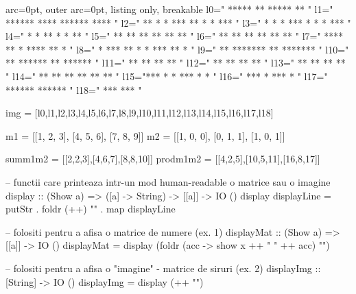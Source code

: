 \begin{tcblisting}{ arc=0pt, outer arc=0pt, listing only, breakable}
l0="        ***** **            ***** **    "
l1="     ******  ****        ******  ****   "
l2="    **   *  *  ***      **   *  *  ***  "
l3="   *    *  *    ***    *    *  *    *** "
l4="       *  *      **        *  *      ** "
l5="      ** **      **       ** **      ** "
l6="      ** **      **       ** **      ** "
l7="    **** **      *      **** **      *  "
l8="   * *** **     *      * *** **     *   "
l9="      ** *******          ** *******    "
l10="      ** ******           ** ******     "
l11="      ** **               ** **         "
l12="      ** **               ** **         "
l13="      ** **               ** **         "
l14=" **   ** **          **   ** **         "
l15="***   *  *          ***   *  *          "
l16=" ***    *            ***    *           "
l17="  ******              ******            "
l18="    ***                 ***             "

img = [l0,l1,l2,l3,l4,l5,l6,l7,l8,l9,l10,l11,l12,l13,l14,l15,l16,l17,l18]

m1 = [[1, 2, 3], [4, 5, 6], [7, 8, 9]]
m2 = [[1, 0, 0], [0, 1, 1], [1, 0, 1]]

summ1m2 = [[2,2,3],[4,6,7],[8,8,10]]
prodm1m2 = [[4,2,5],[10,5,11],[16,8,17]]

-- functii care printeaza intr-un mod human-readable o matrice sau o imagine
display :: (Show a) => ([a] -> String) -> [[a]] -> IO ()
display displayLine = putStr . foldr (++) "" . map displayLine

-- folositi pentru a afisa o matrice de numere (ex. 1)
displayMat :: (Show a) => [[a]] -> IO ()
displayMat = display (foldr (\x acc -> show x ++ "   " ++ acc) "\n")

-- folositi pentru a afisa o "imagine" - matrice de siruri (ex. 2)
displayImg :: [String] -> IO ()
displayImg = display (++ "\n")


\end{tcblisting}
